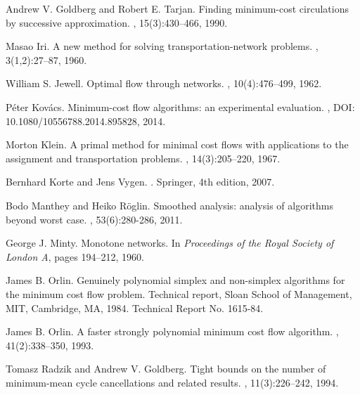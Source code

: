 \documentclass[11pt]{article}
\begin{document}
\begin{thebibliography}{99}
Andrew V. Goldberg and Robert E. Tarjan.
\newblock Finding minimum-cost circulations by successive approximation.
, 15(3):430--466, 1990.

Masao Iri.
\newblock A new method for solving transportation-network problems.
,
  3(1,2):27--87, 1960.

William S. Jewell.
\newblock Optimal flow through networks.
, 10(4):476--499, 1962.





P{\'e}ter Kov{\'a}cs.
\newblock Minimum-cost flow algorithms: an experimental evaluation.
, DOI: 10.1080/10556788.2014.895828, 2014.



Morton Klein.
\newblock A primal method for minimal cost flows with applications to the
  assignment and transportation problems.
, 14(3):205--220, 1967.

Bernhard Korte and Jens Vygen.
.
\newblock Springer, 4th edition, 2007.

Bodo Manthey and Heiko R\"oglin.
\newblock Smoothed analysis: analysis of algorithms beyond worst case.
, 53(6):280-286, 2011.


George J. Minty.
\newblock Monotone networks.
\newblock In {\em Proceedings of the Royal Society of London A}, pages
  194--212, 1960.

James B. Orlin.
\newblock Genuinely polynomial simplex and non-simplex algorithms for the
  minimum cost flow problem.
\newblock Technical report, Sloan School of Management, MIT, Cambridge, MA,
  1984.
\newblock Technical Report No. 1615-84.

James B. Orlin.
\newblock A faster strongly polynomial minimum cost flow algorithm.
, 41(2):338--350, 1993.

Tomasz Radzik and Andrew V. Goldberg.
\newblock Tight bounds on the number of minimum-mean cycle cancellations and
  related results.
, 11(3):226--242, 1994.


\end{thebibliography}
\end{document}

